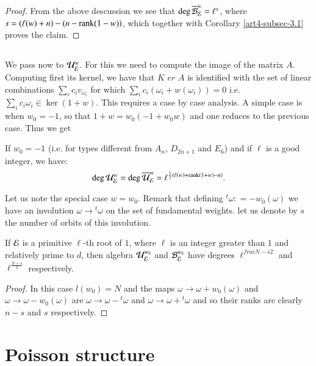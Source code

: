 \begin{proof}
From the above descussion we see that $\deg\overline{\mathcal{B}}_{\mathcal{E}}^{w} = \ell^{s}$, where $s = (\ell(w) +n) -(n -\operatorname{rank}(1-w))$, which together with Corollary \ref{art4-subsec-3.1} proves the claim.
\end{proof}

\subsection{}\label{art4-subsec-3.5}
We pass now to $\mathcal{U}_{\mathcal{E}}^{w}$. For this we need to compute the image of the matrix $A$. Computing first its kernel, we have that $K$ $er$ $A$ is identified with the set of linear combinations $\sum_{i}c_{i}v_{\omega_{i}}$ for which $\sum_{i}c_{i}(\omega_{i}+w(\omega_{i}))=0$ i.e. $\sum_{i}c_{i}\omega_{i}\in \ker(1 + w)$. This requires a case by case analysis. A simple case is when $w_{0} = -1$, so that $1+w = w_{0}(-1 + w_{0}w)$ and one reduces to the previous case. Thus we get

\begin{prop*}
If $w_{0} =-1$ (i.e. for types different from $A_{n}$, $D_{2n+1}$ and $E_{6}$) and if $\ell$ is a good integer, we have:
$$
\deg\mathcal{U}_{\mathcal{E}}^{w} = \deg\overline{\mathcal{U}}_{\mathcal{E}}^{w} = \ell^{\frac{1}{2}(\ell(w)+\operatorname{rank}(1+w)-n)}.
$$
\end{prop*}

Let us note the special case $w=w_{0}$. Remark that defining ${}^{t}\omega : = -w_{0}(\omega)$ we have an involution $\omega \rightarrow {}^{t}\omega$ on the set of fundamental weights. let us denote by $s$ the number of orbits of this involution.

\begin{theorem*}
If $\mathcal{E}$ is a primitive $\ell$-th root of $1$, where $\ell$ is an integer greater than $1$ and relatively prime to $d$, then algebra $\mathcal{U}_{\mathcal{E}}^{w_{0}}$ and $\mathcal{B}_{\mathcal{E}}^{w_{0}}$ have degrees $\ell^{frac{N-s}{2}}$ and $\ell^{\frac{N+s}{2}}$ respectively.
\end{theorem*}

\begin{proof}
In this case $l(w_{0}) = N$ and the maps $\omega \rightarrow \omega +w_{0}(\omega)$ and $\omega \rightarrow \omega-w_{0}(\omega)$ are $\omega \rightarrow \omega - {}^{t}\omega$ and $\omega \rightarrow \omega + {}^{t}\omega$ and so their ranks are clearly $n-s$ and $s$ respectively.
\end{proof}

\section{Poisson structure}\label{art4-sec-4}

